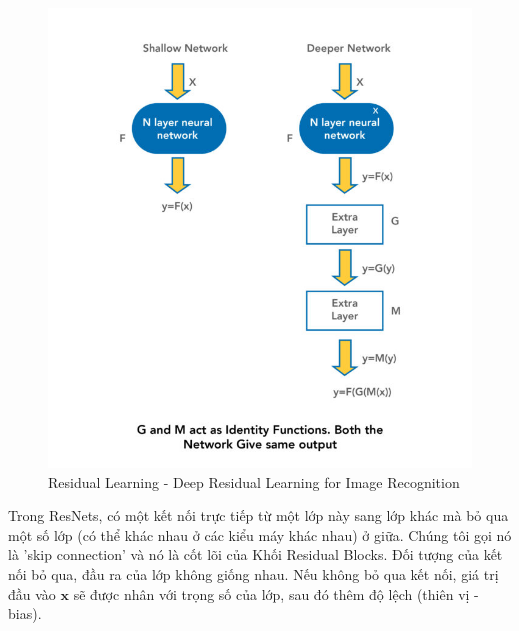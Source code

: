 \documentclass{article}
\begin{document}
	\begin{figure}[H]
		\centering
		\includegraphics[width=0.75\linewidth]{architecture/resnetwork.jpg}
		\caption{Residual Learning - Deep Residual Learning for Image Recognition}
		\label{fig:writing-thesis}
	\end{figure}
	Trong ResNets, có một kết nối trực tiếp từ một lớp này sang lớp khác mà bỏ qua một số lớp (có thể khác nhau ở các kiểu máy khác nhau) ở giữa. Chúng tôi gọi nó là 'skip connection' và nó là cốt lõi của Khối Residual Blocks. Đối tượng của kết nối bỏ qua, đầu ra của lớp không giống nhau. Nếu không bỏ qua kết nối, giá trị đầu vào $\textbf {x}$ sẽ được nhân với trọng số của lớp, sau đó thêm độ lệch (thiên vị - bias).
	
\end{document}
